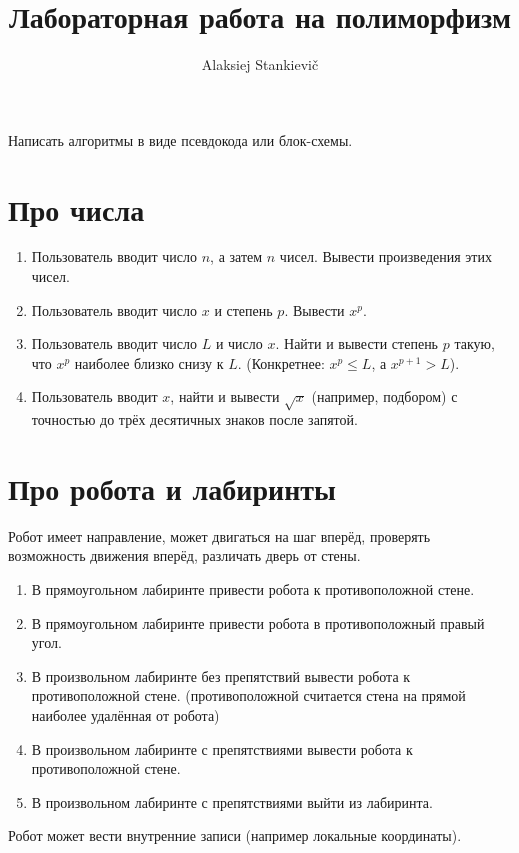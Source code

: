\documentclass[12pt]{article}
\author{Alaksiej Stankievič}
\title{Лабораторная работа на полиморфизм}
\begin{document}
 Написать алгоритмы в виде псевдокода или блок-схемы.
 \section{Про числа}
 \begin{enumerate}
  \item Пользователь вводит число $n$, а затем $n$ чисел. Вывести произведения этих чисел.
  \item Пользователь вводит число $x$ и степень $p$. Вывести $x^p$.
  \item Пользователь вводит число $L$ и число $x$. Найти и вывести степень $p$ такую, что 
  $x^p$ наиболее близко снизу к $L$. (Конкретнее: $x^p\leq{}L$, а $x^{p+1}>L$).
  \item Пользователь вводит $x$, найти и вывести $\sqrt{x}$ (например, подбором) с точностью до трёх десятичных знаков после запятой.
 \end{enumerate}
 
 \section{Про робота и лабиринты}
  Робот имеет направление, может двигаться на шаг вперёд, проверять возможность движения вперёд, различать дверь от стены.
  \begin{enumerate}
   \item В прямоугольном лабиринте привести робота к противоположной стене.
   \item В прямоугольном лабиринте привести робота в противоположный правый угол.
   \item В произвольном лабиринте без препятствий вывести робота к противоположной стене. (противоположной считается стена на прямой наиболее удалённая от робота)
   \item В произвольном лабиринте с препятствиями вывести робота к противоположной стене.
   \item В произвольном лабиринте с препятствиями выйти из лабиринта.
  \end{enumerate}
  Робот может вести внутренние записи (например локальные координаты).
  
\end{document}
